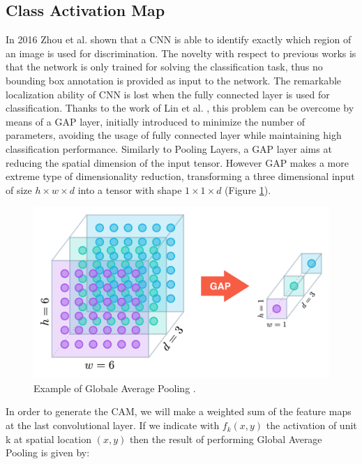\subsection{Class Activation Map}
\label{sec:cam}
In 2016 Zhou et al. \cite{zhou2015cnnlocalization} shown that a \ac{CNN} is able to identify exactly which region of an image is used for discrimination. The novelty with respect to previous works is that the network is only trained for solving the  classification task, thus no bounding box annotation is provided as input to the network. 
The remarkable localization ability of \ac{CNN} is lost when the fully connected layer is used for classification. Thanks to the work of Lin et al. \cite{gap}, this problem can be overcome by means of a \ac{GAP} layer, initially introduced to minimize the number of parameters, avoiding the usage of fully connected layer while maintaining high classification performance. 
Similarly to Pooling Layers, a \ac{GAP} layer aims at reducing the spatial dimension of the input tensor. However \ac{GAP} makes a more extreme type of dimensionality reduction, transforming a three dimensional input of size $h \times w \times d$ into a tensor with shape $1 \times 1 \times d$ (Figure \ref{fig:eigth_figure}).

\begin{figure}[htbp!]
\centering
\includegraphics[scale=0.5]{Tesi/images/GAP}
\caption{Example of Globale Average Pooling \cite{gap_image}.}
\label{fig:eigth_figure}
\end{figure}

\noindent In order to generate the \ac{CAM}, we will make a weighted sum of the feature maps at the last convolutional layer. If we indicate with $f_{k}(x,y)$ the activation of unit k at spatial location $(x,y)$ then the result of performing Global Average Pooling is given by:


